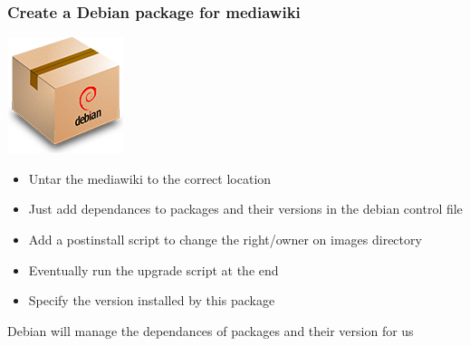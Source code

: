 \documentclass[11pt,compress,final]{beamer}
\begin{document}
\begin{frame}
\frametitle{Create a Debian package for mediawiki}
\begin{center}
\includegraphics[scale=0.3]{figures/deb_package}
\end{center}
\begin{itemize}
\item Untar the mediawiki to the correct location
\item Just add dependances to packages and their versions in the debian control file
\item Add a postinstall script to change the right/owner on images directory
\item Eventually run the upgrade script at the end
\item Specify the version installed by this package
\end{itemize}
\begin{block}{}
Debian will manage the dependances of packages and their version for us
\end{block}
\end{frame}
\end{document}
